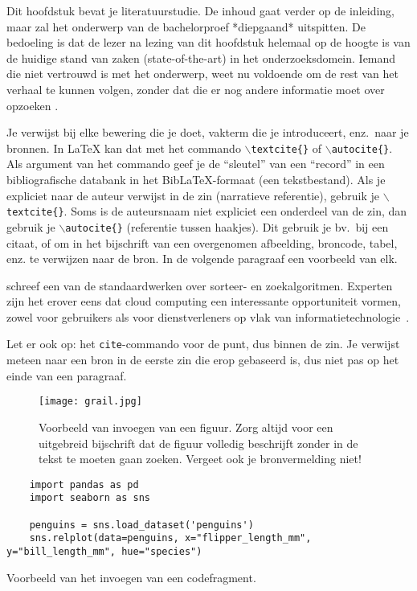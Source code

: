 Dit hoofdstuk bevat je literatuurstudie. De inhoud gaat verder op de inleiding, maar zal het onderwerp van de bachelorproef *diepgaand* uitspitten. De bedoeling is dat de lezer na lezing van dit hoofdstuk helemaal op de hoogte is van de huidige stand van zaken (state-of-the-art) in het onderzoeksdomein. Iemand die niet vertrouwd is met het onderwerp, weet nu voldoende om de rest van het verhaal te kunnen volgen, zonder dat die er nog andere informatie moet over opzoeken \autocite{Pollefliet2011}.

Je verwijst bij elke bewering die je doet, vakterm die je introduceert, enz.\ naar je bronnen. In \LaTeX{} kan dat met het commando \texttt{$\backslash${textcite\{\}}} of \texttt{$\backslash${autocite\{\}}}. Als argument van het commando geef je de ``sleutel'' van een ``record'' in een bibliografische databank in het Bib\LaTeX{}-formaat (een tekstbestand). Als je expliciet naar de auteur verwijst in de zin (narratieve referentie), gebruik je \texttt{$\backslash${}textcite\{\}}. Soms is de auteursnaam niet expliciet een onderdeel van de zin, dan gebruik je \texttt{$\backslash${}autocite\{\}} (referentie tussen haakjes). Dit gebruik je bv.~bij een citaat, of om in het bijschrift van een overgenomen afbeelding, broncode, tabel, enz. te verwijzen naar de bron. In de volgende paragraaf een voorbeeld van elk.

\textcite{Knuth1998} schreef een van de standaardwerken over sorteer- en zoekalgoritmen. Experten zijn het erover eens dat cloud computing een interessante opportuniteit vormen, zowel voor gebruikers als voor dienstverleners op vlak van informatietechnologie~\autocite{Creeger2009}.

Let er ook op: het \texttt{cite}-commando voor de punt, dus binnen de zin. Je verwijst meteen naar een bron in de eerste zin die erop gebaseerd is, dus niet pas op het einde van een paragraaf.

\begin{figure}
  \centering
  \texttt{[image: grail.jpg]}
  \caption[Voorbeeld figuur.]{\label{fig:grail}Voorbeeld van invoegen van een figuur. Zorg altijd voor een uitgebreid bijschrift dat de figuur volledig beschrijft zonder in de tekst te moeten gaan zoeken. Vergeet ook je bronvermelding niet!}
\end{figure}

\begin{listing}
  \begin{verbatim}
    import pandas as pd
    import seaborn as sns

    penguins = sns.load_dataset('penguins')
    sns.relplot(data=penguins, x="flipper_length_mm", y="bill_length_mm", hue="species")
  \end{verbatim}
  \caption[Voorbeeld codefragment]{Voorbeeld van het invoegen van een codefragment.}
\end{listing}

